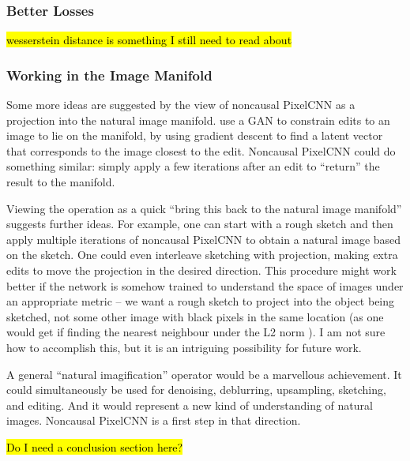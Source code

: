 \documentclass[10pt,a4paper]{article}
\newcommand{\nquote}[1]{``{#1}''}
\begin{document}
\subsubsection{Better Losses}

\hl{wesserstein distance is something I still need to read about}

\subsubsection{Working in the Image Manifold}

Some more ideas are suggested by the view of noncausal PixelCNN as a projection into the natural image manifold. \cite{??} use a GAN to constrain edits to an image to lie on the manifold, by using gradient descent to find a latent vector that corresponds to the image closest to the edit. Noncausal PixelCNN could do something similar: simply apply a few iterations after an edit to \nquote{return} the result to the manifold.

Viewing the operation as a quick \nquote{bring this back to the natural image manifold} suggests further ideas. For example, one can start with a rough sketch and then apply multiple iterations of noncausal PixelCNN to obtain a natural image based on the sketch. One could even interleave sketching with projection, making extra edits to move the projection in the desired direction. This procedure might work better if the network is somehow trained to understand the space of images under an appropriate metric -- we want a rough sketch to project into the object being sketched, not some other image with black pixels in the same location (as one would get if finding the nearest neighbour under the L2 norm \cite{??}). I am not sure how to accomplish this, but it is an intriguing possibility for future work.

A general \nquote{natural imagification} operator would be a marvellous achievement. It could simultaneously be used for denoising, deblurring, upsampling, sketching, and editing. And it would represent a new kind of understanding of natural images. Noncausal PixelCNN is a first step in that direction.

\hl{Do I need a conclusion section here?}


\end{document}
